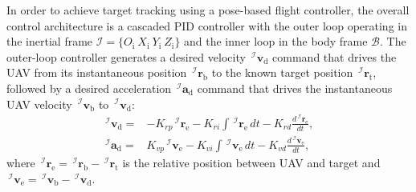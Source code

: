 \documentclass[10pt,journal]{IEEEtran}
\begin{document}
In order to achieve target tracking using a pose-based flight controller, the overall control architecture is a cascaded PID controller with the outer loop operating in the inertial frame $\mathcal{I}=\{O_{\text{i}}~X_{\text{i}}~Y_{\text{i}}~Z_{\text{i}}\}$ and the inner loop in the body frame $\mathcal{B}$. The outer-loop controller generates a desired velocity $\,^\mathcal{I}\boldsymbol{v}_{\text{d}}$ command that drives the UAV from its instantaneous position $\,^\mathcal{I}\boldsymbol{r}_{\text{b}}$ to the known target position $\,^\mathcal{I}\boldsymbol{r}_{\text{t}}$, followed by a desired acceleration $\,^\mathcal{I}\boldsymbol{a}_{\text{d}}$ command that drives the instantaneous UAV velocity $\,^\mathcal{I}\boldsymbol{v}_{\text{b}}$ to $\,^\mathcal{I}\boldsymbol{v}_{\text{d}}$:
\begin{align} \label{sup:outer_loop_control}
    \,^\mathcal{I}\boldsymbol{v}_{\text{d}} =& - K_{rp} \,^\mathcal{I}\boldsymbol{r}_{\text{e}} - K_{ri} \int \,^\mathcal{I}\boldsymbol{r}_{\text{e}}\, dt - K_{rd} \frac{d\,^\mathcal{I}\boldsymbol{r}_{\text{e}}}{dt}, \nonumber \\
    \,^\mathcal{I}\boldsymbol{a}_{\text{d}} =&  K_{vp} \,^\mathcal{I}\boldsymbol{v}_{\text{e}} - K_{vi} \int \,^\mathcal{I}\boldsymbol{v}_{\text{e}}\, dt - K_{vd} \frac{d\,^\mathcal{I}\boldsymbol{v}_{\text{e}}}{dt},
\end{align}
where $\,^\mathcal{I}\boldsymbol{r}_{\text{e}} = \,^\mathcal{I}\boldsymbol{r}_{\text{b}} - \,^\mathcal{I}\boldsymbol{r}_{\text{t}}$ is the relative position between UAV and target and $\,^\mathcal{I}\boldsymbol{v}_{\text{e}} = \,^\mathcal{I}\boldsymbol{v}_{\text{b}} - \,^\mathcal{I}\boldsymbol{v}_{\text{d}}$.
\end{document}
